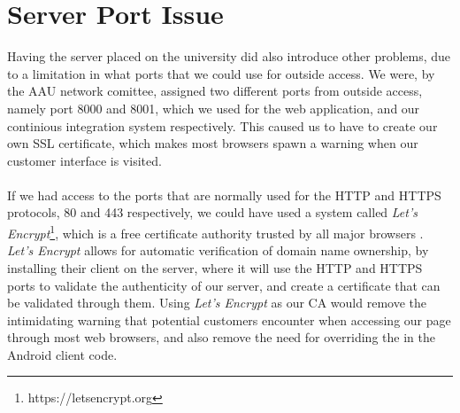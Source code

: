
\section{Server Port Issue}
\label{sec:server_port_issue}

Having the server placed on the university did also introduce other problems, due to a limitation in what ports that we could use for outside access. We were, by the AAU network comittee, assigned two different ports from outside access, namely port 8000 and 8001, which we used for the web application, and our continious integration system respectively. This caused us to have to create our own SSL certificate, which makes most browsers spawn a warning when our customer interface is visited. 
\\\\
If we had access to the ports that are normally used for the HTTP and HTTPS protocols, 80 and 443 respectively, we could have used a system called \emph{Let's Encrypt}\footnote{https://letsencrypt.org}, which is a free certificate authority trusted by all major browsers \parencite{lets_encrypt_all_browsers}. \emph{Let's Encrypt} allows for automatic verification of domain name ownership, by installing their client on the server, where it will use the HTTP and HTTPS ports to validate the authenticity of our server, and create a certificate that can be validated through them. Using \emph{Let's Encrypt} as our CA would remove the intimidating warning that potential customers encounter when accessing our page through most web browsers, and also remove the need for overriding the  in the Android client code.